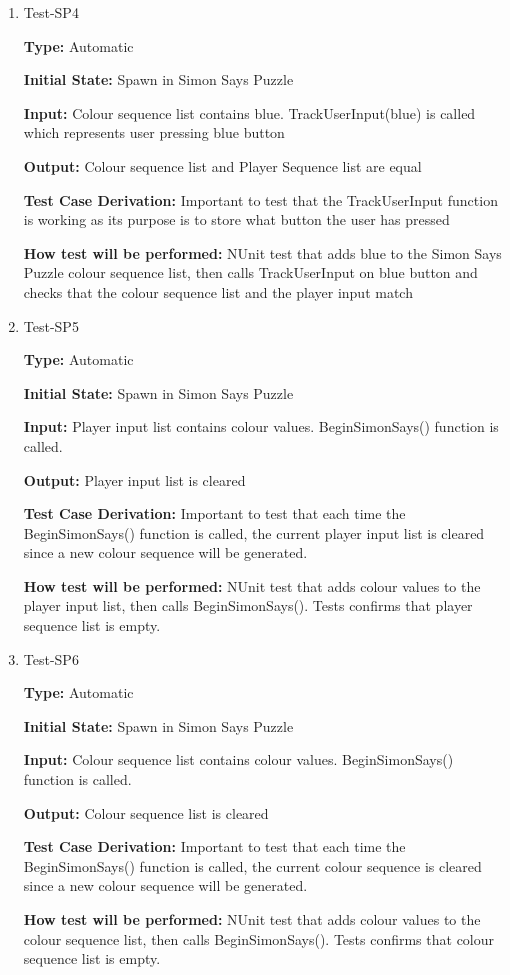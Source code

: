 \documentclass[12pt, titlepage]{article}
\begin{document}
\begin{enumerate}
\item{Test-SP4\\}

\textbf{Type:} Automatic
 
\textbf{Initial State:} Spawn in Simon Says Puzzle

\textbf{Input:} Colour sequence list contains blue. TrackUserInput(blue) is called which represents user pressing blue button

\textbf{Output:} Colour sequence list and Player Sequence list are equal

\textbf{Test Case Derivation:} Important to test that the TrackUserInput function is working as its purpose is to store what button the user has pressed

\textbf{How test will be performed:} NUnit test that adds blue to the Simon Says Puzzle colour sequence list, then calls TrackUserInput on blue button and checks that the colour sequence list and the player input match

\item{Test-SP5\\}

\textbf{Type:} Automatic
 
\textbf{Initial State:} Spawn in Simon Says Puzzle

\textbf{Input:} Player input list contains colour values. BeginSimonSays() function is called.

\textbf{Output:} Player input list is cleared

\textbf{Test Case Derivation:} Important to test that each time the BeginSimonSays() function is called, the current player input list is cleared since a new colour sequence will be generated.

\textbf{How test will be performed:} NUnit test that adds colour values to the player input list, then calls BeginSimonSays(). Tests confirms that player sequence list is empty.

\item{Test-SP6\\}

\textbf{Type:} Automatic
 
\textbf{Initial State:} Spawn in Simon Says Puzzle

\textbf{Input:} Colour sequence list contains colour values. BeginSimonSays() function is called.

\textbf{Output:} Colour sequence list is cleared

\textbf{Test Case Derivation:} Important to test that each time the BeginSimonSays() function is called, the current colour sequence is cleared since a new colour sequence will be generated.

\textbf{How test will be performed:} NUnit test that adds colour values to the colour sequence list, then calls BeginSimonSays(). Tests confirms that colour sequence list is empty.

\end{enumerate}
\end{document}
